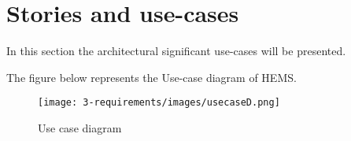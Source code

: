 \clearpage
\section{Stories and use-cases}

In this section the architectural significant use-cases will be presented.


The figure below represents the Use-case diagram of HEMS.
\begin{figure}[H]
	\centering
	\texttt{[image: 3-requirements/images/usecaseD.png]}
	\caption{Use case diagram}
	\label{fig:template-view-architecture}
\end{figure}

